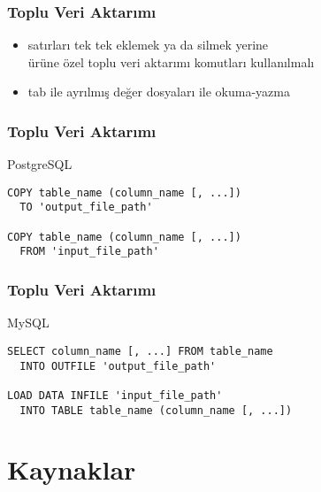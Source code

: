 \documentclass[dvipsnames]{beamer}
\theoremstyle{definition}
\theoremstyle{example}
\theoremstyle{plain}
\begin{document}
\begin{frame}[fragile]
  \frametitle{Toplu Veri Aktarımı}

  \begin{itemize}
    \item satırları tek tek eklemek ya da silmek yerine\\
      ürüne özel toplu veri aktarımı komutları kullanılmalı

    \item tab ile ayrılmış değer dosyaları ile okuma-yazma
  \end{itemize}
\end{frame}

\begin{frame}[fragile]
  \frametitle{Toplu Veri Aktarımı}

  \begin{block}{PostgreSQL}
    \begin{lstlisting}
COPY table_name (column_name [, ...])
  TO 'output_file_path'

COPY table_name (column_name [, ...])
  FROM 'input_file_path'
    \end{lstlisting}
  \end{block}
\end{frame}

\begin{frame}[fragile]
  \frametitle{Toplu Veri Aktarımı}

  \begin{block}{MySQL}
    \begin{lstlisting}
SELECT column_name [, ...] FROM table_name
  INTO OUTFILE 'output_file_path'

LOAD DATA INFILE 'input_file_path'
  INTO TABLE table_name (column_name [, ...])
    \end{lstlisting}
  \end{block}
\end{frame}

\section*{Kaynaklar}
\end{document}
